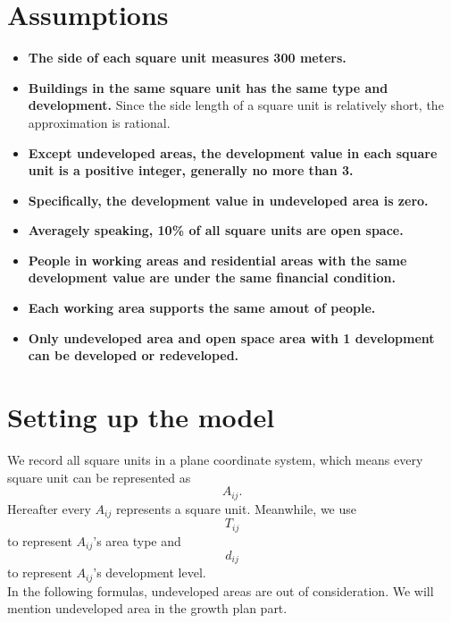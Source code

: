 
\section{Assumptions}
\begin{itemize}
  \item \textbf{The side of each square unit measures 300 meters.}
  \item \textbf{Buildings in the same square unit has the same type and development.} Since the side length of a square unit is relatively short, the approximation is rational.
  \item \textbf{Except undeveloped areas, the development value in each square unit is a positive integer, generally no more than 3.}
  \item \textbf{Specifically, the development value in undeveloped area is zero.}
  \item \textbf{Averagely speaking, 10\% of all square units are open space.}
  \item \textbf{People in working areas and residential areas with the same development value are under the same financial condition.}
  \item \textbf{Each working area supports the same amout of people.}
  \item \textbf{Only undeveloped area and open space area with 1 development can be developed or redeveloped.}
\end{itemize}


\section{Setting up the model}
We record all square units in a plane coordinate system, which means every square unit can be represented as $$ A_{ij}. $$
Hereafter every $ A_{ij} $ represents a square unit.
Meanwhile, we use $$ T_{ij} $$ to represent $ A_{ij} $'s area type and $$ d_{ij} $$ to represent $ A_{ij} $'s development level.
\\
In the following formulas, undeveloped areas are out of consideration. We will mention undeveloped area in the growth plan part.
\\
